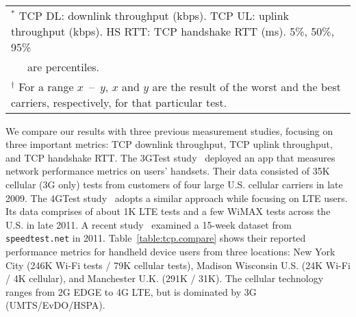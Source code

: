 \begin{table*}[t]
\begin{tabular}{|c|c|c|c|c|c|c|c|c|c|c|}
\end{tabular}
\\
\begin{tabular}{l}
{$^*$ TCP DL: downlink throughput (kbps). TCP UL: uplink throughput (kbps). HS RTT: TCP handshake RTT (ms). 5\%, 50\%, 95\%}\\
{\ \ \ are percentiles.}\\
{$^{\dag}$ For a range $x$\ --\ $y$, $x$ and $y$ are the result of the worst and the best carriers, respectively, for that particular test.}\\
\end{tabular}
\label{table:tcp.compare}
\end{table*}


We compare our results with three previous measurement studies, focusing on three important metrics: TCP downlink throughput, TCP uplink throughput, and TCP handshake RTT.
The 3GTest study~\cite{mobisys.3gtest} deployed an app that measures network performance metrics on users' handsets. Their data consisted of 35K cellular (3G only) tests from customers of four large U.S. cellular carriers in late 2009. The 4GTest study~\cite{huang_mobisys12} adopts a similar approach while focusing on LTE users. Its data comprises of about 1K LTE tests and a few WiMAX tests across the U.S. in late 2011. A recent study~\cite{sommers12} examined a 15-week dataset from \texttt{speedtest.net} in 2011. Table~\ref{table:tcp.compare} shows their reported performance metrics for handheld device users from three locations: New York City (246K Wi-Fi tests / 79K cellular tests), Madison Wisconsin U.S. (24K Wi-Fi / 4K cellular), and Manchester U.K. (291K / 31K). The cellular technology ranges from 2G EDGE to 4G LTE, but is dominated by 3G (UMTS/EvDO/HSPA).


